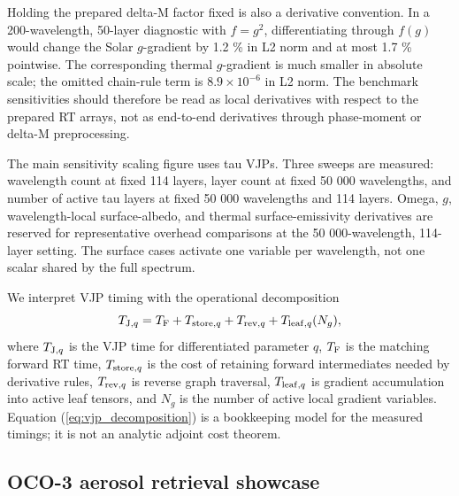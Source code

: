\documentclass[gmd, manuscript]{copernicus}
\begin{document}
Holding the prepared delta-M factor fixed is also a derivative convention.  In a
200-wavelength, 50-layer diagnostic with $f=g^2$, differentiating through $f(g)$ would
change the Solar $g$-gradient by 1.2 \% in L2 norm and at most 1.7 \% pointwise.
The corresponding thermal $g$-gradient is much smaller in absolute scale; the omitted
chain-rule term is $8.9\times10^{-6}$ in L2 norm.  The benchmark sensitivities should
therefore be read as local derivatives with respect to the prepared RT arrays, not as
end-to-end derivatives through phase-moment or delta-M preprocessing.

The main sensitivity scaling figure uses tau VJPs.  Three sweeps are measured:
wavelength count at fixed 114 layers, layer count at fixed 50 000 wavelengths, and
number of active tau layers at fixed 50 000 wavelengths and 114 layers.  Omega,
$g$, wavelength-local surface-albedo, and thermal surface-emissivity derivatives are
reserved for representative overhead comparisons at the 50 000-wavelength, 114-layer
setting.  The surface cases activate one variable per wavelength, not one scalar shared
by the full spectrum.

We interpret VJP timing with the operational decomposition
\begin{equation}
  T_{{\rm J},q}
  =
  T_{\rm F}
  + T_{{\rm store},q}
  + T_{{\rm rev},q}
  + T_{{\rm leaf},q}(N_g),
  \label{eq:vjp_decomposition}
\end{equation}
where $T_{{\rm J},q}$ is the VJP time for differentiated parameter $q$, $T_{\rm F}$ is
the matching forward RT time, $T_{{\rm store},q}$ is the cost of retaining forward
intermediates needed by derivative rules, $T_{{\rm rev},q}$ is reverse graph traversal,
$T_{{\rm leaf},q}$ is gradient accumulation into active leaf tensors, and $N_g$ is the
number of active local gradient variables.  Equation (\ref{eq:vjp_decomposition}) is a
bookkeeping model for the measured timings; it is not an analytic adjoint cost theorem.

\subsection{OCO-3 aerosol retrieval showcase}
\end{document}
